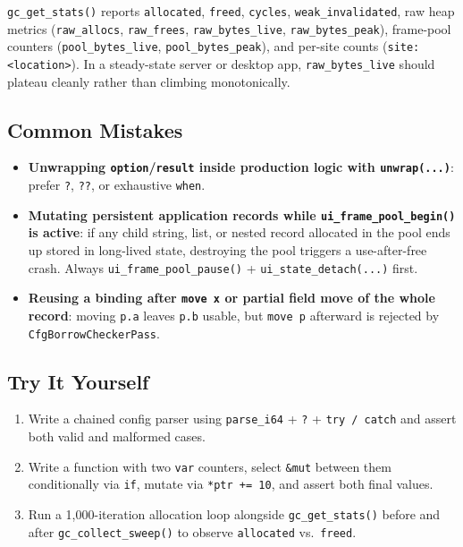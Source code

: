 \documentclass[
  english,
  oneside]{book}
\providecommand{\tightlist}{%
  \setlength{\itemsep}{0pt}\setlength{\parskip}{0pt}}
\begin{document}
\texttt{gc\_get\_stats()} reports \texttt{allocated}, \texttt{freed},
\texttt{cycles}, \texttt{weak\_invalidated}, raw heap metrics
(\texttt{raw\_allocs}, \texttt{raw\_frees}, \texttt{raw\_bytes\_live},
\texttt{raw\_bytes\_peak}), frame-pool counters
(\texttt{pool\_bytes\_live}, \texttt{pool\_bytes\_peak}), and per-site
counts (\texttt{site:\textless{}location\textgreater{}}). In a
steady-state server or desktop app, \texttt{raw\_bytes\_live} should
plateau cleanly rather than climbing monotonically.

\subsection{Common Mistakes}\label{common-mistakes-7}

\begin{itemize}
\tightlist
\item
  \textbf{Unwrapping \texttt{option}/\texttt{result} inside production
  logic with \texttt{unwrap(...)}}: prefer \texttt{?}, \texttt{??}, or
  exhaustive \texttt{when}.
\item
  \textbf{Mutating persistent application records while
  \texttt{ui\_frame\_pool\_begin()} is active}: if any child string,
  list, or nested record allocated in the pool ends up stored in
  long-lived state, destroying the pool triggers a use-after-free crash.
  Always \texttt{ui\_frame\_pool\_pause()} +
  \texttt{ui\_state\_detach(...)} first.
\item
  \textbf{Reusing a binding after \texttt{move\ x} or partial field move
  of the whole record}: moving \texttt{p.a} leaves \texttt{p.b} usable,
  but \texttt{move\ p} afterward is rejected by
  \texttt{CfgBorrowCheckerPass}.
\end{itemize}

\subsection{Try It Yourself}\label{try-it-yourself-7}

\begin{enumerate}
\def\labelenumi{\arabic{enumi}.}
\tightlist
\item
  Write a chained config parser using \texttt{parse\_i64} + \texttt{?} +
  \texttt{try\ /\ catch} and assert both valid and malformed cases.
\item
  Write a function with two \texttt{var} counters, select \texttt{\&mut}
  between them conditionally via \texttt{if}, mutate via
  \texttt{*ptr\ +=\ 10}, and assert both final values.
\item
  Run a 1,000-iteration allocation loop alongside
  \texttt{gc\_get\_stats()} before and after
  \texttt{gc\_collect\_sweep()} to observe \texttt{allocated}
  vs.~\texttt{freed}.
\end{enumerate}
\end{document}
